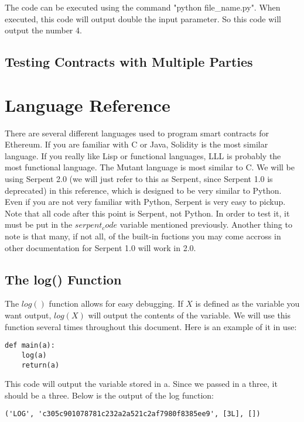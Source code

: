 \documentclass[12pt]{article}
\begin{document}
The code can be executed using the command "python file\_name.py". When executed, this code will output double the input parameter. So this code will output the number 4. \cite{test_contracts.py,Using pyethereum.tester}

\subsection{Testing Contracts with Multiple Parties}

\section{Language Reference}

There are several different languages used to program smart contracts for Ethereum. If you are familiar with C or Java, Solidity is the most similar language. If you really like Lisp or functional languages, LLL is probably the most functional language. The Mutant language is most similar to C. We will be using Serpent 2.0 (we will just refer to this as Serpent, since Serpent 1.0 is deprecated) in this reference, which is designed to be very similar to Python. Even if you are not very familiar with Python, Serpent is very easy to pickup. Note that all code after this point is Serpent, not Python. In order to test it, it must be put in the $serpent_code$ variable mentioned previously. Another thing to note is that many, if not all, of the built-in fuctions you may come accross in other documentation for Serpent 1.0 will work in 2.0.

\subsection{The log() Function}

The $log()$ function allows for easy debugging. If $X$ is defined as the variable you want output, $log(X)$ will output the contents of the variable. We will use this function several times throughout this document. Here is an example of it in use:

\begin{lstlisting}
def main(a):
	log(a)
	return(a)
\end{lstlisting}
This code will output the variable stored in a. Since we passed in a three, it should be a three. Below is the output of the log function:

\begin{lstlisting}
('LOG', 'c305c901078781c232a2a521c2af7980f8385ee9', [3L], [])
\end{lstlisting}
\end{document}
